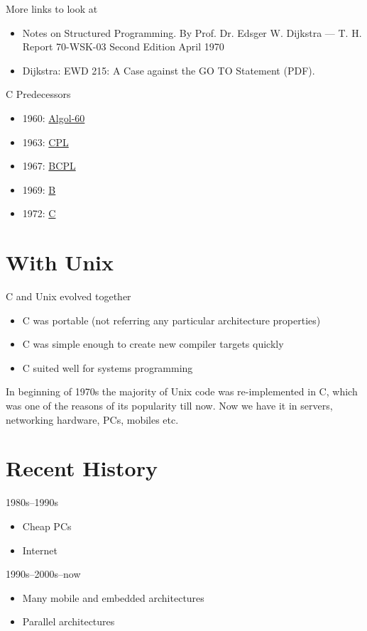 \documentclass[xetex,aspectratio=149]{beamer}
\begin{document}
\begin{frame}{More links to look at}
	\begin{itemize}
		\item Notes on Structured Programming. By Prof. Dr. Edsger W. Dijkstra — T. H. Report 70-WSK-03 Second Edition April 1970
		\item Dijkstra: EWD 215: A Case against the GO TO Statement (PDF).
	\end{itemize}
\end{frame}

\begin{frame}{C Predecessors}
	\begin{itemize}
		\item 1960: \href{https://en.wikipedia.org/wiki/ALGOL_60\#Code_sample_comparisons}{Algol-60}
		\item 1963: \href{https://en.wikipedia.org/wiki/CPL_(programming_language)\#Example}{CPL}
		\item 1967: \href{https://en.wikipedia.org/wiki/BCPL\#Examples}{BCPL}
		\item 1969: \href{https://en.wikipedia.org/wiki/B_(programming_language)\#Examples}{B}
		\item 1972: \href{https://en.wikipedia.org/wiki/C_(programming_language)\#\%22Hello,_world\%22_example}{C}
	\end{itemize}
\end{frame}

\section{With Unix}

\begin{frame}{C and Unix evolved together}
	\begin{itemize}
		\item C was portable (not referring any particular architecture properties)
		\item C was simple enough to create new compiler targets quickly
		\item C suited well for systems programming
	\end{itemize}

	\pause
	In beginning of 1970s the majority of Unix code was re-implemented in C, which was one of the reasons of its popularity till now. Now we have it in servers, networking hardware, PCs, mobiles etc.
\end{frame}

\section{Recent History}

\begin{frame}{1980s--1990s}
	\begin{itemize}
	\item Cheap PCs
	\item Internet
	\end{itemize}
\end{frame}

\begin{frame}{1990s--2000s--now}
	\begin{itemize}
		\item Many mobile and embedded architectures
		\item Parallel architectures
	\end{itemize}
\end{frame}

\postamble
\end{document}
